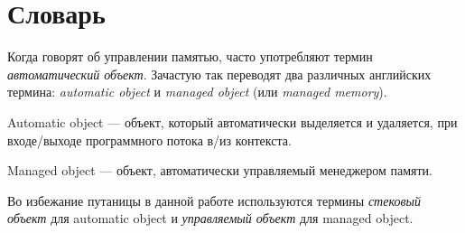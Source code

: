 \section*{Словарь}
Когда говорят об управлении памятью, часто употребляют термин \textit{автоматический объект}.
Зачастую так переводят два различных английских термина: \textit{automatic object} и \textit{managed object} (или
\textit{managed memory}).

Automatic object --- объект, который автоматически выделяется и удаляется, при входе/выходе программного потока в/из контекста.

Managed object --- объект, автоматически управляемый менеджером памяти.

Во избежание путаницы в данной работе используются термины \textit{стековый объект} для automatic object
и \textit{управляемый объект} для managed object.